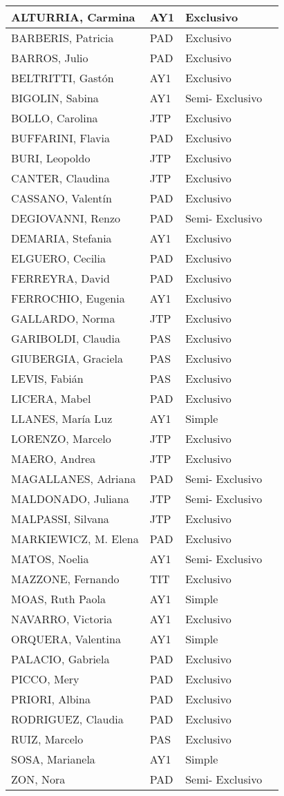\documentclass[a4paper, 12pt]{article}
\begin{document}
\begin{xltabular}{1\textwidth}{|l|l|l|l|}
ALTURRIA, Carmina&AY1& Exclusivo\\ \hline
BARBERIS, Patricia&PAD&Exclusivo\\ \hline
BARROS, Julio&PAD&Exclusivo\\ \hline
BELTRITTI, Gastón&AY1&Exclusivo\\ \hline
BIGOLIN, Sabina&AY1&Semi- Exclusivo\\ \hline
BOLLO, Carolina&JTP&Exclusivo\\ \hline
BUFFARINI, Flavia&PAD&Exclusivo\\ \hline
BURI, Leopoldo&JTP&Exclusivo\\ \hline
CANTER, Claudina&JTP&Exclusivo\\ \hline
CASSANO, Valentín&PAD&Exclusivo\\ \hline
DEGIOVANNI, Renzo&PAD&Semi- Exclusivo\\ \hline
DEMARIA, Stefania&AY1& Exclusivo\\ \hline
ELGUERO, Cecilia&PAD&Exclusivo\\ \hline
FERREYRA, David&PAD&Exclusivo\\ \hline
FERROCHIO, Eugenia&AY1& Exclusivo\\ \hline
GALLARDO, Norma&JTP&Exclusivo\\ \hline
GARIBOLDI, Claudia&PAS&Exclusivo\\ \hline
GIUBERGIA, Graciela&PAS&Exclusivo\\ \hline
LEVIS, Fabián&PAS&Exclusivo\\ \hline
LICERA, Mabel&PAD&Exclusivo\\ \hline
LLANES, María Luz&AY1&Simple\\ \hline
LORENZO, Marcelo&JTP&Exclusivo\\ \hline
MAERO, Andrea&JTP&Exclusivo\\ \hline
MAGALLANES, Adriana&PAD&Semi- Exclusivo\\ \hline
MALDONADO, Juliana&JTP&Semi- Exclusivo\\ \hline
MALPASSI, Silvana&JTP&Exclusivo\\ \hline
MARKIEWICZ, M. Elena&PAD&Exclusivo\\ \hline
MATOS, Noelia&AY1&Semi- Exclusivo\\ \hline
MAZZONE, Fernando&TIT&Exclusivo\\ \hline
MOAS, Ruth Paola&AY1&Simple\\ \hline
NAVARRO, Victoria&AY1& Exclusivo\\ \hline
ORQUERA, Valentina&AY1&Simple\\ \hline
PALACIO, Gabriela&PAD&Exclusivo\\ \hline
PICCO, Mery&PAD&Exclusivo\\ \hline
PRIORI, Albina&PAD&Exclusivo\\ \hline
RODRIGUEZ, Claudia&PAD&Exclusivo\\ \hline
RUIZ, Marcelo&PAS&Exclusivo\\ \hline
SOSA, Marianela&AY1&Simple\\ \hline
ZON, Nora&PAD&Semi- Exclusivo\\ \hline

\end{xltabular}
\end{document}
